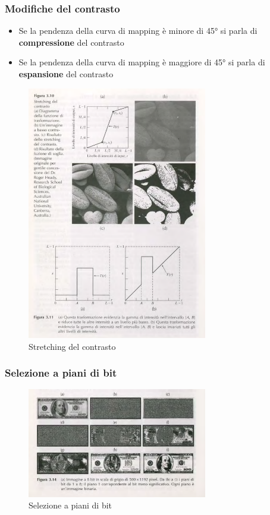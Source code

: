 \documentclass[12pt]{article}
\begin{document}
\subsubsection{Modifiche del contrasto}
\begin{itemize}
    \item Se la pendenza della curva di mapping è minore di 45° si parla di \textbf{compressione} del contrasto
    \item Se la pendenza della curva di mapping è maggiore di 45° si parla di \textbf{espansione} del contrasto
\end{itemize}
\begin{figure}[!htb]
    \centering
    \includegraphics[width=0.7\textwidth]{Images/contrasto.png}
    \caption{Stretching del contrasto}
\end{figure}
\FloatBarrier
\subsubsection{Selezione a piani di bit}
\begin{figure}[!htb]
    \centering
    \includegraphics[width=0.7\textwidth]{Images/8b.png}
    \caption{Selezione a piani di bit}
\end{figure}
\FloatBarrier
\end{document}
